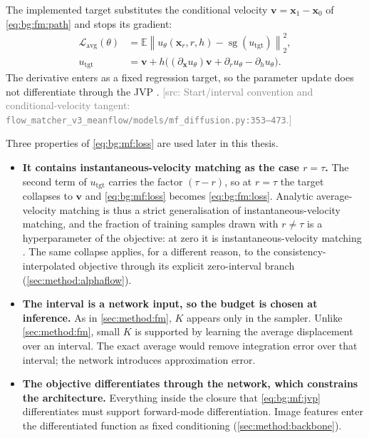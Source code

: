 \documentclass[headsepline,footsepline,footinclude=false,oneside,fontsize=11pt,paper=a4,listof=totoc,bibliography=totoc]{scrbook}
\theoremstyle{definition}
\theoremstyle{plain}
\theoremstyle{remark}
\newcommand{\vect}[1]{\boldsymbol{#1}}
\newcommand{\sidx}[1]{_{\textrm{#1}}}
\newcommand{\E}{\mathbb{E}}                    %
\newcommand{\sg}{\operatorname{sg}}            %
\newcommand{\afield}{u}                        %
\newcommand{\ftime}{\tau}                      %
\newcommand{\nfe}{K}                           %
\newif\ifsubmission
\newcommand{\srcnote}[1]{\ifsubmission\else\textcolor{gray}{\footnotesize\textsf{[src: #1]}}\fi}
\begin{document}
The implemented target substitutes the conditional velocity
$\vect{v}=\vect{x}_{1}-\vect{x}_{0}$ of \eqref{eq:bg:fm:path} and stops its gradient:
\begin{equation}\label{eq:bg:mf:loss}
\begin{aligned}
  \mathcal{L}\sidx{avg}(\theta)
    &=\E\left\|\afield_{\theta}(\vect{x}_{r},r,h)
           -\sg(\afield\sidx{tgt})\right\|_{2}^{2},\\
  \afield\sidx{tgt}
    &=\vect{v}+h\big((\partial_{\vect{x}}\afield_{\theta})\vect{v}
                     +\partial_{r}\afield_{\theta}-\partial_{h}\afield_{\theta}\big).
\end{aligned}
\end{equation}
The derivative enters as a fixed regression target, so the parameter update does not differentiate
through the JVP \parencite[Eqs.~(7)--(11)]{geng2025meanflow}.
\srcnote{Start/interval convention and conditional-velocity tangent:
\texttt{flow\_matcher\_v3\_meanflow/models/mf\_diffusion.py:353--473}.}

Three properties of \eqref{eq:bg:mf:loss} are used later in this thesis.

\begin{itemize}
  \item \textbf{It contains instantaneous-velocity matching as the case $r = \ftime$.} The second term of
    $\afield\sidx{tgt}$ carries the factor $(\ftime-r)$, so at $r=\ftime$ the target collapses to
    $\vect{v}$ and \eqref{eq:bg:mf:loss} becomes \eqref{eq:bg:fm:loss}. Analytic
    average-velocity matching is thus a strict generalisation of instantaneous-velocity matching, and the fraction of training
    samples drawn with $r \neq \ftime$ is a hyperparameter of the objective: at zero it is
    instantaneous-velocity matching
    \parencite[Tab.~1a]{geng2025meanflow}. The same collapse applies, for a different reason, to the
    consistency-interpolated objective through its explicit zero-interval branch
    (\autoref{sec:method:alphaflow}).
  \item \textbf{The interval is a network input, so the budget is chosen at inference.} As in
    \autoref{sec:method:fm}, $\nfe$ appears only in the sampler. Unlike \autoref{sec:method:fm}, small $\nfe$ is
    supported by learning the average displacement over an interval. The exact average would
    remove integration error over that interval; the network introduces approximation error.
  \item \textbf{The objective differentiates through the network, which constrains the
    architecture.} Everything inside the closure that \eqref{eq:bg:mf:jvp} differentiates must
    support forward-mode differentiation. Image features enter the differentiated function as
    fixed conditioning (\autoref{sec:method:backbone}).
\end{itemize}
\end{document}
